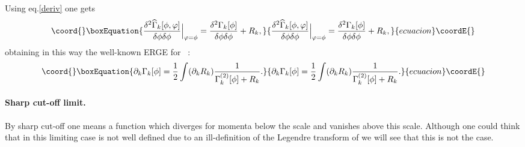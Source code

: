 \documentclass[a4paper,12pt]{article}
\begin{document}
Using eq.\eqref{deriv} one gets
\begin{equation}\coord{}\boxEquation{
           \frac{\delta^2 \widehat{\Gamma}_k[\phi,\varphi]}{\delta\phi\delta\phi}{\Big |}_{\varphi=\phi}= \frac{\delta^2 \Gamma_k[\phi]}{\delta\phi\delta\phi} + R_k,
}{
           \frac{\delta^2 \widehat{\Gamma}_k[\phi,\varphi]}{\delta\phi\delta\phi}{\Big |}_{\varphi=\phi}= \frac{\delta^2 \Gamma_k[\phi]}{\delta\phi\delta\phi} + R_k,
}{ecuacion}\coordE{}\end{equation}
obtaining in this way the well-known ERGE for \coordHE{}~\cite{wet93,bon93}:
\begin{equation}\coord{}\boxEquation{\label{floweq}
           \partial_k \Gamma_k[\phi] = \meio\int(\partial_k R_k)\frac{1}{\Gamma_k^{(2)}[\phi] + R_k}.
}{\partial_k \Gamma_k[\phi] = \meio\int(\partial_k R_k)\frac{1}{\Gamma_k^{(2)}[\phi] + R_k}.
}{ecuacion}\coordE{}\end{equation}

\paragraph{Sharp cut-off limit.} By sharp cut-off one means a function \coordHE{} which diverges for momenta below the scale \coordHE{} and vanishes above this scale. Although one could think that in this limiting case \coordHE{} is not well defined due to an ill-definition of the Legendre transform of \coordHE{} we will see that this is not the case. 
\end{document}
